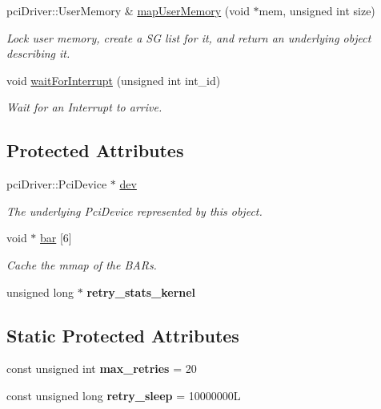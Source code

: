 \begin{CompactItemize}
pci\-Driver::User\-Memory \& \hyperlink{classmprace_1_1PCIDriver_a8}{map\-User\-Memory} (void $\ast$mem, unsigned int size)
\begin{CompactList}\small\item\em Lock user memory, create a SG list for it, and return an underlying object describing it. \item\end{CompactList}\item 
void \hyperlink{classmprace_1_1PCIDriver_a9}{wait\-For\-Interrupt} (unsigned int int\_\-id)
\begin{CompactList}\small\item\em Wait for an Interrupt to arrive. \item\end{CompactList}\end{CompactItemize}
\subsection*{Protected Attributes}
\begin{CompactItemize}
\item 
pci\-Driver::Pci\-Device $\ast$ \hyperlink{classmprace_1_1PCIDriver_p0}{dev}
\begin{CompactList}\small\item\em The underlying Pci\-Device represented by this object. \item\end{CompactList}\item 
void $\ast$ \hyperlink{classmprace_1_1PCIDriver_p1}{bar} \mbox{[}6\mbox{]}
\begin{CompactList}\small\item\em Cache the mmap of the BARs. \item\end{CompactList}\item 
\hypertarget{classmprace_1_1PCIDriver_p2}{
unsigned long $\ast$ {\bf retry\_\-stats\_\-kernel}}
\label{classmprace_1_1PCIDriver_p2}

\end{CompactItemize}
\subsection*{Static Protected Attributes}
\begin{CompactItemize}
\item 
\hypertarget{classmprace_1_1PCIDriver_t0}{
const unsigned int {\bf max\_\-retries} = 20}
\label{classmprace_1_1PCIDriver_t0}

\item 
\hypertarget{classmprace_1_1PCIDriver_t1}{
const unsigned long {\bf retry\_\-sleep} = 10000000L}
\label{classmprace_1_1PCIDriver_t1}

\end{CompactItemize}



